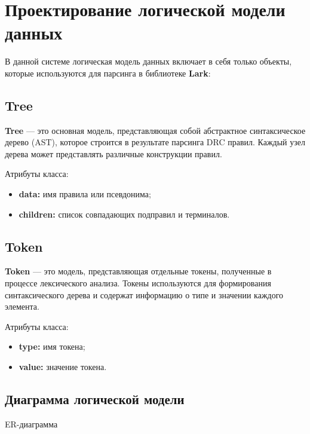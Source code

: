 \section{Проектирование логической модели данных}

В данной системе логическая модель данных включает в себя только объекты,
которые используются для парсинга в библиотеке \textbf{Lark}:

\subsection{Tree}

\textbf{Tree} --- это основная модель,
представляющая собой абстрактное синтаксическое дерево (AST),
которое строится в результате парсинга DRC правил.
Каждый узел дерева может представлять различные конструкции правил.

Атрибуты класса:

\begin{itemize}
	\item \textbf{data:} имя правила или псевдонима;
	\item \textbf{children:} список совпадающих подправил и терминалов.
\end{itemize}

\subsection{Token}

\textbf{Token} --- это модель, представляющая отдельные токены,
полученные в процессе лексического анализа.
Токены используются для формирования синтаксического дерева
и содержат информацию о типе и значении каждого элемента.

Атрибуты класса:

\begin{itemize}
	\item \textbf{type:} имя токена;
	\item \textbf{value:} значение токена.
\end{itemize}

\subsection{Диаграмма логической модели}

\begin{image}
	\caption{ER-диаграмма}
	\label{fig:er}
\end{image}

